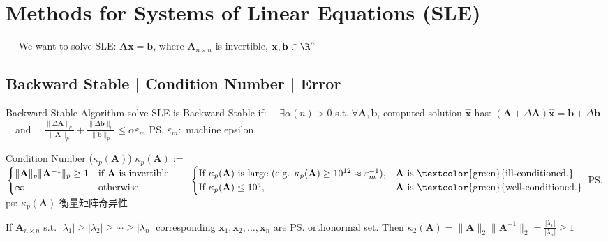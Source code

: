 \documentclass{note}
\begin{document}
\section{Methods for Systems of Linear Equations (SLE)}

\vspace{-0.05cm}
\qquad \ \ {\scriptsize {} We want to solve SLE: $\mathbf{A}\mathbf{x}=\mathbf{b}$, where $\mathbf{A}_{n\times n}$ is invertible, $\mathbf{x},\mathbf{b}\in\R^n$}
\vspace{-0.1cm}

\subsection{Backward Stable | Condition Number | Error}

\begin{MyTh}{Backward Stable}
  \scriptsize
  Algorithm solve SLE is Backward Stable if: \ \ $\exists \alpha(n)>0$ s.t. $\forall \mathbf{A}, \mathbf{b}$, computed solution $\widehat{\mathbf{x}}$ has:
  \quad $(\mathbf{A} + \Delta \mathbf{A})\widehat{\mathbf{x}} = \mathbf{b} + \Delta \mathbf{b}$ \ \ and  \ \ $\frac{\|\Delta \mathbf{A}\|_p}{\|\mathbf{A}\|_p} + \frac{\|\Delta \mathbf{b}\|_p}{\|\mathbf{b}\|_p} \leq \alpha \varepsilon_m$ \quad \ps{$\varepsilon_m:$ machine epsilon.}
\end{MyTh}

\vspace{-4pt}
\begin{MyTh}{Condition Number ($\kappa_p(\mathbf{A})$)}
    $\kappa_p(\mathbf{A}):=$
    {\tiny
    $\begin{cases}
      \|\mathbf{A}\|_p\|\mathbf{A}^{-1}\|_p\geq 1& \text{if } \mathbf{A} \text{ is invertible} \\
      \infty & \text{otherwise}
    \end{cases}
    \qquad\begin{cases}
      \text{If $\kappa_p(\mathbf{A})$ is large (e.g. $\kappa_p(\mathbf{A})\ge10^{12}\approx\varepsilon_m^{-1}$)}, & \text{$\mathbf{A}$ is \textcolor{green}{ill-conditioned.}} \\
      \text{If $\kappa_p(\mathbf{A})\leq10^4$}, & \text{$\mathbf{A}$ is \textcolor{green}{well-conditioned.}}
    \end{cases}$
    }
    \qquad \ps{ps: $\kappa_p(\mathbf{A})$ 衡量矩阵奇异性}

    \vspace{-5pt}
    {\quad \footnotesize If $\mathbf{A}_{n\times n}$ s.t. $|\lambda_1| \geq |\lambda_2| \geq \cdots \geq |\lambda_n|$ corresponding $\mathbf{x}_1, \mathbf{x}_2, \ldots, \mathbf{x}_n$ are \ps{orthonormal set}.  \quad Then $\kappa_2(\mathbf{A}) = \|\mathbf{A}\|_2\|\mathbf{A}^{-1}\|_2 = \frac{|\lambda_1|}{|\lambda_n|}\geq1$}
\end{MyTh}
\end{document}
